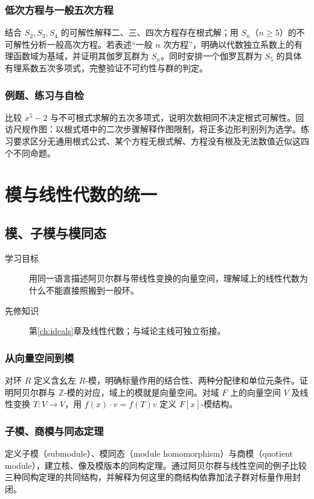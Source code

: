 \documentclass[UTF8,12pt,a4paper,fontset=fandol]{ctexbook}
\begin{document}
\section{低次方程与一般五次方程}
结合 $S_2,S_3,S_4$ 的可解性解释二、三、四次方程存在根式解；用 $S_n$（$n\geq5$）的不可解性分析一般高次方程。若表述“一般 $n$ 次方程”，明确以代数独立系数上的有理函数域为基域，并证明其伽罗瓦群为 $S_n$。同时安排一个伽罗瓦群为 $S_5$ 的具体有理系数五次多项式，完整验证不可约性与群的判定。

\section{例题、练习与自检}
比较 $x^5-2$ 与不可根式求解的五次多项式，说明次数相同不决定根式可解性。回访尺规作图：以根式塔中的二次步骤解释作图限制，将正多边形判别列为选学。练习要求区分无通用根式公式、某个方程无根式解、方程没有根及无法数值近似这四个不同命题。

\part{模与线性代数的统一}

\chapter{模、子模与模同态}\label{ch:modules}

\begin{description}
  \item[学习目标] 用同一语言描述阿贝尔群与带线性变换的向量空间，理解域上的线性代数为什么不能直接照搬到一般环。
  \item[先修知识] 第\ref{ch:ideals}章及线性代数；与域论主线可独立衔接。
\end{description}

\section{从向量空间到模}
对环 $R$ 定义含幺左 $R$-模，明确标量作用的结合性、两种分配律和单位元条件。证明阿贝尔群与 $\mathbb Z$-模的对应，域上的模就是向量空间。对域 $F$ 上的向量空间 $V$ 及线性变换 $T:V\to V$，用 $f(x)\cdot v=f(T)v$ 定义 $F[x]$-模结构。

\section{子模、商模与同态定理}
定义子模（submodule）、模同态（module homomorphism）与商模（quotient module），建立核、像及模版本的同构定理。通过阿贝尔群与线性空间的例子比较三种同构定理的共同结构，并解释为何这里的商结构依靠加法子群对标量作用封闭。
\end{document}
